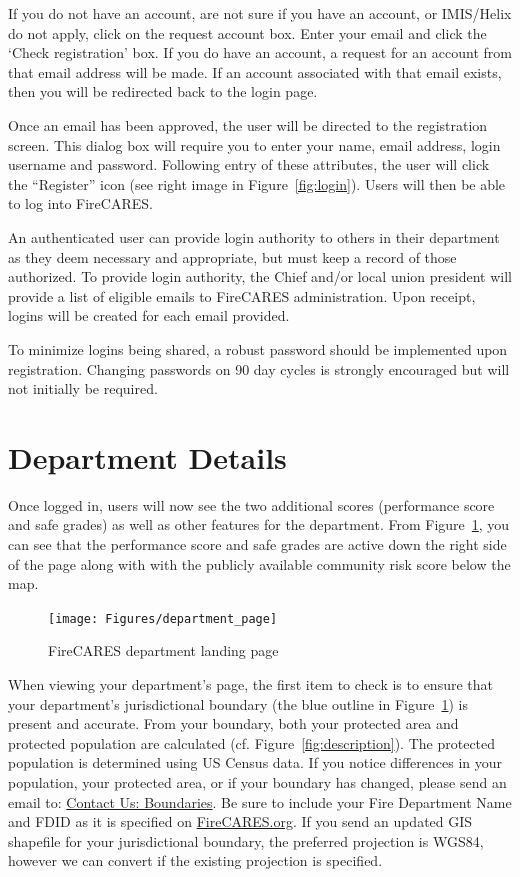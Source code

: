 \documentclass[12pt,oneside]{book}
\begin{document}
If you do not have an account, are not sure if you have an account, or IMIS/Helix do not apply, click on the request account box. Enter your email and click the `Check registration' box. If you do have an account, a request for an account from that email address will be made. If an account associated with that email exists, then you will be redirected back to the login page. 

Once an email has been approved, the user will be directed to the registration screen. This dialog box will require you to enter your name, email address, login username and password.  Following entry of these attributes, the user will click the ``Register'' icon (see right image in Figure~\ref{fig:login}). Users will then be able to log into FireCARES.

An authenticated user can provide login authority to others in their department as they deem necessary and appropriate, but must keep a record of those authorized. To provide login authority, the Chief and/or local union president will provide a list of eligible emails to FireCARES administration.  Upon receipt, logins will be created for each email provided.

To minimize logins being shared, a robust password should be implemented upon registration. Changing passwords on 90 day cycles is strongly encouraged but will not initially be required.

\clearpage

\section{Department Details}

Once logged in, users will now see the two additional scores (performance score and safe grades) as well as other features for the department. From Figure~\ref{fig:department_page}, you can see that the performance score and safe grades are active down the right side of the page along with with the publicly available community risk score below the map.

\begin{figure}[ht!]
\centering
\texttt{[image: Figures/department\_page]}
\caption{FireCARES department landing page}
\label{fig:department_page}
\end{figure}

When viewing your department's page, the first item to check is to ensure that your department's jurisdictional boundary (the blue outline in Figure~\ref{fig:department_page}) is present and accurate.  From your boundary, both your protected area and protected population are calculated (cf. Figure~\ref{fig:description}). The protected population is determined using US Census data. If you notice differences in your population, your protected area, or if your boundary has changed, please send an email to: \href{mailto:boundaries@firecares.org}{Contact Us: Boundaries}. Be sure to include your Fire Department Name and FDID as it is specified on \href{https://www.FireCARES.org}{FireCARES.org}. If you send an updated GIS shapefile for your jurisdictional boundary, the preferred projection is WGS84, however we can convert if the existing projection is specified.
\end{document}
